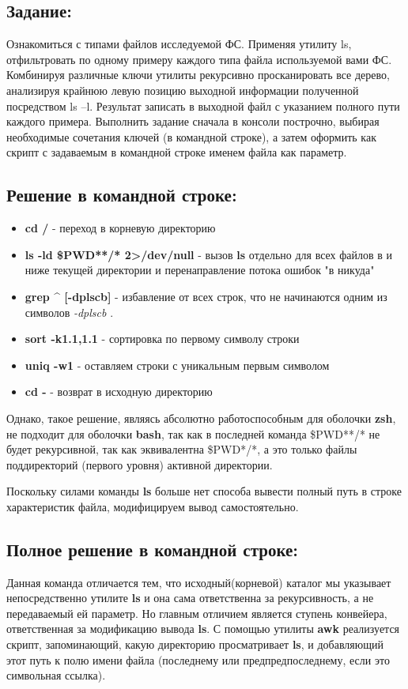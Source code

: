 \documentclass[a4paper]{article}
\begin{document}
\subsection{Задание:} Ознакомиться с типами файлов исследуемой ФС.
Применяя утилиту ls, отфильтровать по одному примеру каждого типа файла используемой вами ФС. Комбинируя различные ключи утилиты рекурсивно просканировать все дерево, анализируя крайнюю левую позицию выходной информации полученной посредством ls –l. Результат записать в выходной файл с указанием полного пути каждого примера. Выполнить задание сначала в консоли построчно, выбирая необходимые сочетания ключей  (в командной строке), а затем оформить как скрипт с задаваемым в командной строке именем файла как параметр.

\subsection{Решение в командной строке:}

\begin{itemize}
\item \textbf{cd /} - переход в корневую директорию
\item \textbf{ls -ld \$PWD**/* 2>/dev/null} - вызов \textbf{ls} отдельно для всех файлов в и ниже текущей директории и перенаправление потока ошибок "в никуда"
\item \textbf{grep \^{} [-dplscb]} - избавление от всех строк, что не начинаются одним из символов \textit{-dplscb} .
\item \textbf{sort -k1.1,1.1} - сортировка по первому символу строки
\item \textbf{uniq -w1} - оставляем строки с уникальным первым символом
\item \textbf{cd -} - возврат в исходную директорию
\end{itemize}

Однако, такое решение, являясь абсолютно работоспособным для оболочки \textbf{zsh}, не подходит для оболочки \textbf{bash}, так как в последней команда \$PWD**/* не будет рекурсивной, так как эквивалентна \$PWD*/*, а это только файлы поддиректорий (первого уровня) активной директории.

Поскольку силами команды \textbf{ls} больше нет способа вывести полный путь в строке характеристик файла, модифицируем вывод самостоятельно.

\subsection{Полное решение в командной строке:}

Данная команда отличается тем, что исходный(корневой) каталог мы указывает непосредственно утилите \textbf{ls} и она сама ответственна за рекурсивность, а не передаваемый ей параметр. Но главным отличием является ступень конвейера, ответственная за модификацию вывода \textbf{ls}. С помощью утилиты \textbf{awk} реализуется скрипт, запоминающий, какую директорию просматривает \textbf{ls}, и добавляющий этот путь к полю имени файла (последнему или предпредпоследнему, если это символьная ссылка).
\end{document}
